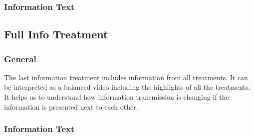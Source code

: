 \documentclass[11pt]{article}
\begin{document}
\subsubsection*{Information Text}
\subsection{Full Info Treatment}
\subsubsection*{General}
The last information treatment includes information from all treatments. It can be interpreted as a balanced video including the highlights of all the treatments. It helps us to understand how information transmission is changing if the information is presented next to each other. 
\subsubsection*{Information Text}
\end{document}
